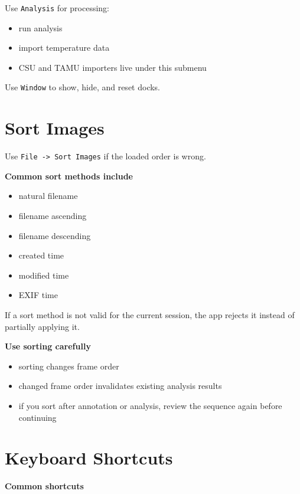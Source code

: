 \documentclass[
  9pt,
  letterpaper,
  oneside,
  open=any,
  DIV=15,
  parskip=half-,
  headings=big,
  numbers=noenddot
]{scrbook}
\newcommand{\manuallead}[1]{%
  \vspace{0.15em}%
  {\sffamily\bfseries\color{ManualBlue}#1}\par\nobreak\vspace{0.05em}%
}
\begin{document}
Use \texttt{Analysis} for processing:


\begin{itemize}[leftmargin=*,itemsep=0.35em,topsep=0.4em]
\item run analysis
\item import temperature data
\item CSU and TAMU importers live under this submenu
\end{itemize}

Use \texttt{Window} to show, hide, and reset docks.


\section{Sort Images}

Use \texttt{File -> Sort Images} if the loaded order is wrong.


\manuallead{Common sort methods include}

\begin{itemize}[leftmargin=*,itemsep=0.35em,topsep=0.4em]
\item natural filename
\item filename ascending
\item filename descending
\item created time
\item modified time
\item EXIF time
\end{itemize}

If a sort method is not valid for the current session, the app rejects it instead of partially applying it.


\manuallead{Use sorting carefully}

\begin{itemize}[leftmargin=*,itemsep=0.35em,topsep=0.4em]
\item sorting changes frame order
\item changed frame order invalidates existing analysis results
\item if you sort after annotation or analysis, review the sequence again before continuing
\end{itemize}

\section{Keyboard Shortcuts}

\manuallead{Common shortcuts}
\end{document}
